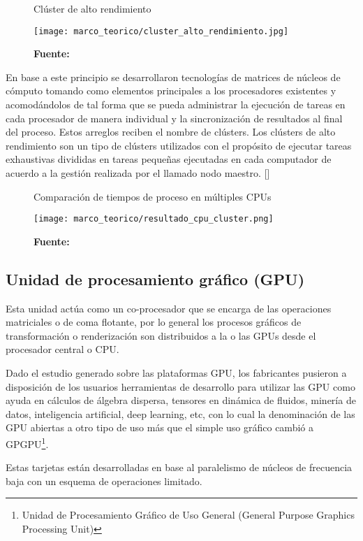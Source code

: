 \documentclass[../main/main.tex]{subfiles}
\begin{document}
  \begin{figure}
    \centering
    \caption{Clúster de alto rendimiento}
    \texttt{[image: marco\_teorico/cluster\_alto\_rendimiento.jpg]}
    \caption*{\textbf{Fuente:} \cite[p.~2]{article:cluster_alto_rendimiento}}
  \end{figure}

  En base a este principio se desarrollaron tecnologías de matrices de núcleos de cómputo tomando como elementos principales a los procesadores existentes y acomodándolos de tal forma que se pueda administrar la ejecución de tareas en cada procesador de manera individual y la sincronización de resultados al final del proceso. Estos arreglos reciben el nombre de clústers. Los clústers de alto rendimiento son un tipo de clústers utilizados con el propósito de ejecutar tareas exhaustivas divididas en tareas pequeñas ejecutadas en cada computador de acuerdo a la gestión realizada por el llamado nodo maestro. [\cite{article:cluster_alto_rendimiento}]

  \begin{figure}[H]
    \centering
    \caption{Comparación de tiempos de proceso en múltiples CPUs}
    \texttt{[image: marco\_teorico/resultado\_cpu\_cluster.png]}
    \caption*{\textbf{Fuente:} \cite[p.~7]{article:cluster_alto_rendimiento}}
  \end{figure}

  \subsection{Unidad de procesamiento gráfico (GPU)}

  Esta unidad actúa como un co-procesador que se encarga de las operaciones matriciales o de coma flotante, por lo general los procesos gráficos de transformación o renderización son distribuidos a la o las GPUs desde el procesador central o CPU.

  Dado el estudio generado sobre las plataformas GPU, los fabricantes pusieron a disposición de los usuarios herramientas de desarrollo para utilizar las GPU como ayuda en cálculos de álgebra dispersa, tensores en dinámica de fluidos, minería de datos, inteligencia artificial, deep learning, etc, con lo cual la denominación de las GPU abiertas a otro tipo de uso más que el simple uso gráfico cambió a GPGPU\footnote{Unidad de Procesamiento Gráfico de Uso General (General Purpose Graphics Processing Unit)}.

  Estas tarjetas están desarrolladas en base al paralelismo de núcleos de frecuencia baja con un esquema de operaciones limitado.
\end{document}
